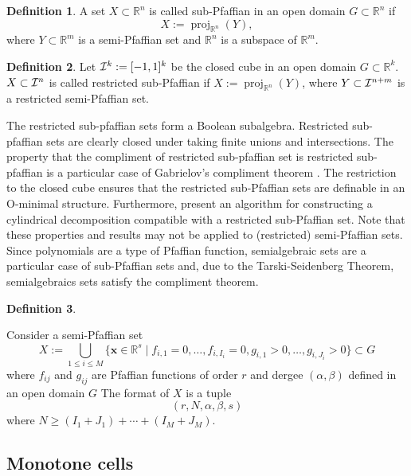 \documentclass[
]{book}
\theoremstyle{definition}
\newtheorem{definition}{Definition}[chapter]
\theoremstyle{definition}
\theoremstyle{definition}
\theoremstyle{definition}
\theoremstyle{remark}
\begin{document}
\begin{definition}
\citep[Definition 2.8]{gv04}
A set \(X \subset \mathbb{R}^n\) is called sub-Pfaffian in an open domain \(G \subset \mathbb{R}^n\) if
\[
X := {\operatorname{proj}_{\mathbb{R}^{n}}}(Y),
\]
where \(Y \subset \mathbb{R}^m\) is a semi-Pfaffian set and \(\mathbb{R}^n\) is a subspace of \(\mathbb{R}^m\).
\end{definition}

\begin{definition}
\citep[2.9]{gv04}
Let \({\cal I}^k := [-1,1]^k\) be the closed cube in an open domain \(G \subset \mathbb{R}^k\).
\(X \subset {\cal I}^n\) is called restricted sub-Pfaffian if \(X := {\operatorname{proj}_{\mathbb{R}^{n}}}(Y)\), where \(Y \subset {\cal I}^{n+m}\) is a restricted semi-Pfaffian set.
\end{definition}

The restricted sub-pfaffian sets form a Boolean subalgebra. Restricted sub-pfaffian sets are clearly closed under taking finite unions and intersections. The property that the compliment of restricted sub-pfaffian set is restricted sub-pfaffian is a particular case of Gabrielov's compliment theorem \citep{gabrielov1996}. The restriction to the closed cube ensures that the restricted sub-Pfaffian sets are definable in an O-minimal structure. Furthermore, \citet{gv01} present an algorithm for constructing a cylindrical decomposition compatible with a restricted sub-Pfaffian set. Note that these properties and results may not be applied to (restricted) semi-Pfaffian sets. Since polynomials are a type of Pfaffian function, semialgebraic sets are a particular case of sub-Pfaffian sets and, due to the Tarski-Seidenberg Theorem, semialgebraics sets satisfy the compliment theorem.

\begin{definition}
\protect\hypertarget{def:pfaff-format}{}\label{def:pfaff-format}\citep[Definition 2.11]{gv04}

Consider a semi-Pfaffian set
\[
X := \bigcup_{1 \le i \le M} \{ \mathbf{x} \in \mathbb{R}^s \mid f_{i,1} = 0, \ldots, f_{i,I_i} = 0, g_{i,1} > 0, \ldots, g_{i,J_i} > 0 \} \subset G
\]
where \(f_{ij}\) and \(g_{ij}\) are Pfaffian functions of order \(r\) and dergee \((\alpha, \beta)\) defined in an open domain \(G\)
The format of \(X\) is a tuple
\[
(r, N, \alpha, \beta, s)
\]
where \(N \ge (I_1 + J_1) + \cdots + (I_M + J_M)\).
\end{definition}

\hypertarget{monotone-cells}{%
\subsection{Monotone cells}\label{monotone-cells}}
\end{document}
